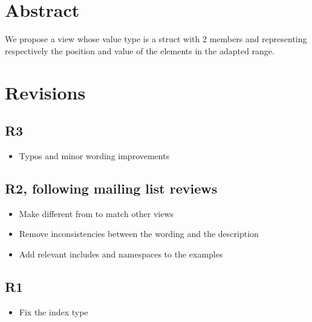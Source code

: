 \documentclass{wg21}
\title{\tcode{views::enumerate}}
\author{Corentin Jabot}{corentin.jabot@gmail.com}
\begin{document}
\maketitle


\section{Abstract}

We propose a view  whose value type is a struct with 2 members  and 
representing respectively the position and value of the elements in the adapted range. 

\section{Revisions}

\subsection{R3}

\begin{itemize}
    \item Typos and minor wording improvements
\end{itemize}

\subsection{R2, following mailing list reviews}
\begin{itemize}
    \item Make  different from   to match other views
    \item Remove inconsistencies between the wording and the description
    \item Add relevant includes and namespaces to the examples
\end{itemize}


\subsection{R1}
\begin{itemize}
\item Fix the index type
\end{itemize}
\end{document}

